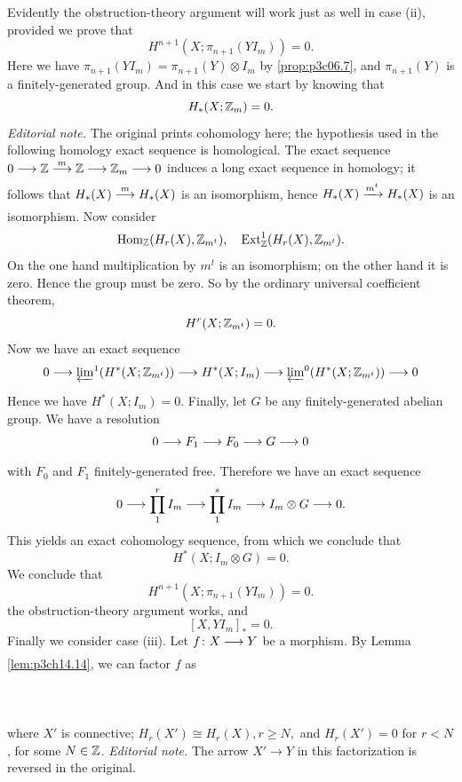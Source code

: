 \documentclass[../main]{subfiles}
\begin{document}
Evidently the obstruction-theory argument will work just as well in case (ii), provided we prove that 
\[
H^{n+1}(X;\pi_{n+1}(YI_{m}))=0
.\]
Here we have $\pi_{n+1}(YI_{m})=\pi_{n+1}(Y)\otimes I_{m}$ by \ref{prop:p3c06.7}, and $\pi_{n+1}(Y)$ is a finitely-generated group. And in this case we start by knowing that 
\[
  H_\ast(X;\mathbb{Z}_m)=0.
\] 
\noindent\textit{Editorial note.} The original prints cohomology here; the hypothesis used in the following homology exact sequence is homological.
The exact sequence $0 \lar{} \bZ \vra{m} \bZ \lar{} \bZ_{m} \lar{} 0 $ induces a long exact sequence in homology; it follows that $H_{\ast}(X) \vra{m} H_{\ast}(X) $ is an isomorphism, hence $H_{\ast}(X) \vra{m^t}  H_{\ast}(X)$ is an isomorphism. Now consider 
\[
\mathrm{Hom}_{\mathbb{Z}} (H_{r}(X), \mathbb{Z}_{m^t}), \quad \mathrm{Ext}^1_{\mathbb{Z}}(H_{r}(X),\mathbb{Z}_{m^t}).
\] 
On the one hand multiplication by $m^t$ is an isomorphism; on the other hand it is zero. Hence the group must be zero. So by the ordinary universal coefficient theorem, 
 \[
  H^r(X;\mathbb{Z}_{m^t}) = 0.
\] 
Now we have an exact sequence 
\[
  0 \lar{} \varprojlim\!^1 (H^\ast(X;\bZ_{m^t})) \lar{} H^\ast(X;I_{m}) \lar{} \varprojlim\!^0(H^\ast(X;\bZ_{m^t})) \lar{} 0
\] 
Hence we have $H^\ast(X;I_{m})=0$. Finally, let $G$ be any finitely-generated abelian group. We have a resolution
\[
  0 \lar{} F_1 \lar{} F_0 \lar{} G \lar{} 0
\] 
with $F_0$ and $F_1$ finitely-generated free. Therefore we have an exact sequence 
\[
  0 \lar{} \prod_{1}^{r} I_{m} \lar{} \prod_{1}^{s} I_{m} \lar{} I_{m} \otimes G \lar{} 0.  
\] 
This yields an exact cohomology sequence, from which we conclude that 
\[
  H^\ast(X;I_{m} \otimes G)=0.
\] 
We conclude that 
\[
H^{n+1}(X;\pi_{n+1}(YI_{m}))=0.
\] 
the obstruction-theory argument works, and 
\[
  \left[X,YI_{m}\right]_{\ast}=0.
\] 
Finally we consider case (iii). Let $f\colon  X \lar{}  Y $ be a morphism. By Lemma \ref{lem:p3ch14.14}, we can factor $f$ as 
~\\~\\
~\\~\\
where $X'$ is connective; $H_{r}(X') \cong H_{r}(X), r \ge N, $ and $H_{r}(X') =0$ for $r < N$, for some  $N \in \mathbb{Z}$.
\noindent\textit{Editorial note.} The arrow $X'\to Y$ in this factorization is reversed in the original.
\end{document}
